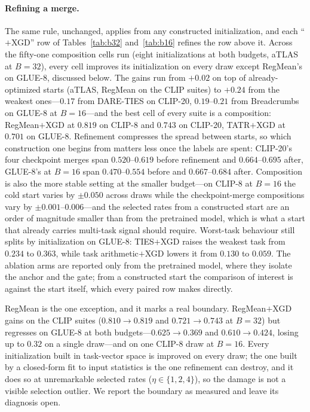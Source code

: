 \documentclass{article} %
\begin{document}
\paragraph{Refining a merge.}
The same rule, unchanged, applies from any constructed initialization, and each ``$+$XGD'' row of Tables~\ref{tab:b32} and~\ref{tab:b16} refines the row above it. Across the fifty-one composition cells run (eight initializations at both budgets, aTLAS at $B=32$), every cell improves its initialization on every draw except RegMean's on GLUE-8, discussed below. The gains run from ${+}0.02$ on top of already-optimized starts (aTLAS, RegMean on the CLIP suites) to ${+}0.24$ from the weakest ones---$0.17$ from DARE-TIES on CLIP-20, $0.19$--$0.21$ from Breadcrumbs on GLUE-8 at $B=16$---and the best cell of every suite is a composition: RegMean$+$XGD at $0.819$ on CLIP-8 and $0.743$ on CLIP-20, TATR$+$XGD at $0.701$ on GLUE-8. Refinement compresses the spread between starts, so which construction one begins from matters less once the labels are spent: CLIP-20's four checkpoint merges span $0.520$--$0.619$ before refinement and $0.664$--$0.695$ after, GLUE-8's at $B=16$ span $0.470$--$0.554$ before and $0.667$--$0.684$ after. Composition is also the more stable setting at the smaller budget---on CLIP-8 at $B=16$ the cold start varies by $\pm0.050$ across draws while the checkpoint-merge compositions vary by $\pm0.001$--$0.006$---and the selected rates from a constructed start are an order of magnitude smaller than from the pretrained model, which is what a start that already carries multi-task signal should require. Worst-task behaviour still splits by initialization on GLUE-8: TIES$+$XGD raises the weakest task from $0.234$ to $0.363$, while task arithmetic$+$XGD lowers it from $0.130$ to $0.059$. The ablation arms are reported only from the pretrained model, where they isolate the anchor and the gate; from a constructed start the comparison of interest is against the start itself, which every paired row makes directly.

RegMean is the one exception, and it marks a real boundary. RegMean$+$XGD gains on the CLIP suites ($0.810\to0.819$ and $0.721\to0.743$ at $B=32$) but regresses on GLUE-8 at both budgets---$0.625\to0.369$ and $0.610\to0.424$, losing up to $0.32$ on a single draw---and on one CLIP-8 draw at $B=16$. Every initialization built in task-vector space is improved on every draw; the one built by a closed-form fit to input statistics is the one refinement can destroy, and it does so at unremarkable selected rates ($\eta\in\{1,2,4\}$), so the damage is not a visible selection outlier. We report the boundary as measured and leave its diagnosis open.
\end{document}
